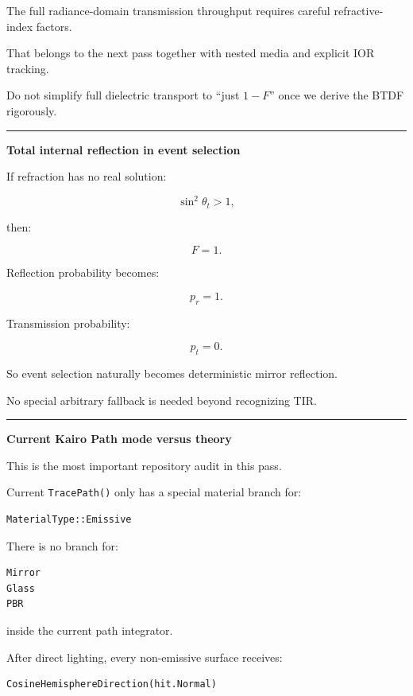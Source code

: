 The full radiance-domain transmission throughput requires careful refractive-index factors.

That belongs to the next pass together with nested media and explicit IOR tracking.

Do not simplify full dielectric transport to ``just \(1-F\)'' once we derive the BTDF rigorously.

\begin{center}\rule{0.5\linewidth}{0.5pt}\end{center}

\textbf{Total internal reflection in event selection}

If refraction has no real solution:

\[
\sin^2\theta_t>1,
\]

then:

\[
F=1.
\]

Reflection probability becomes:

\[
p_r=1.
\]

Transmission probability:

\[
p_t=0.
\]

So event selection naturally becomes deterministic mirror reflection.

No special arbitrary fallback is needed beyond recognizing TIR.

\begin{center}\rule{0.5\linewidth}{0.5pt}\end{center}

\textbf{Current Kairo Path mode versus theory}

This is the most important repository audit in this pass.

Current \texttt{TracePath()} only has a special material branch for:

\begin{verbatim}
MaterialType::Emissive
\end{verbatim}

There is no branch for:

\begin{verbatim}
Mirror
Glass
PBR
\end{verbatim}

inside the current path integrator.

After direct lighting, every non-emissive surface receives:

\begin{verbatim}
CosineHemisphereDirection(hit.Normal)
\end{verbatim}

